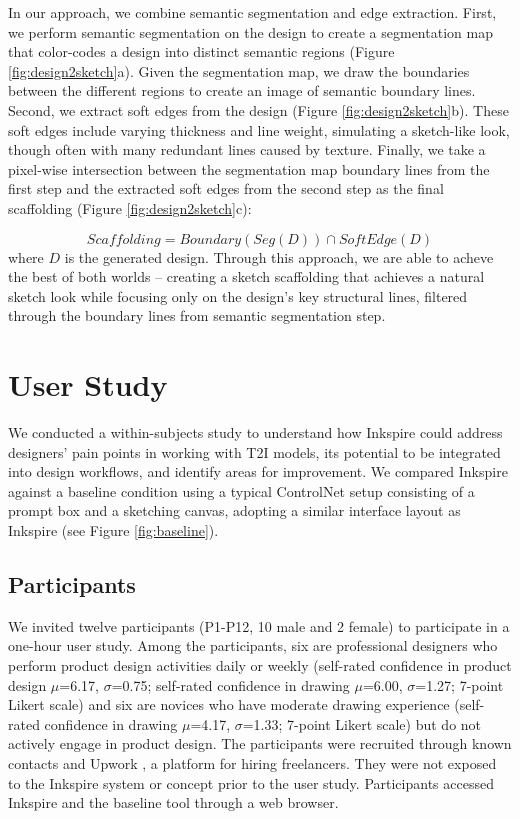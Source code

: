 \documentclass[sigconf, screen]{acmart}
\begin{document}
In our approach, we combine semantic segmentation and edge extraction.
First, we perform semantic segmentation on the design \cite{kirillov2023segment} to create a segmentation map that color-codes a design into distinct semantic regions (Figure \ref{fig:design2sketch}a). Given the segmentation map, we draw the boundaries between the different regions to create an image of semantic boundary lines. Second, we extract soft edges from the design \cite{xie2015holistically} (Figure \ref{fig:design2sketch}b).
These soft edges include varying thickness and line weight, simulating a sketch-like look, though often with many redundant lines caused by texture.
Finally, we take a pixel-wise intersection between the segmentation map boundary lines from the first step and the extracted soft edges from the second step as the final scaffolding (Figure \ref{fig:design2sketch}c):

\begin{equation}
\textit{Scaffolding} = \textit{Boundary}(\textit{Seg}(D)) \cap \textit{SoftEdge}(D)
\end{equation}
where $D$ is the generated design.
Through this approach, we are able to acheve the best of both worlds -- creating a sketch scaffolding that achieves a natural sketch look while focusing only on the design's key structural lines, filtered through the boundary lines from semantic segmentation step.

\section{User Study}

We conducted a within-subjects study to understand how Inkspire could address designers' pain points in working with T2I models, its potential to be integrated into design workflows, and identify areas for improvement. We compared Inkspire against a baseline condition using a typical ControlNet \cite{zhang2023adding} setup consisting of a prompt box and a sketching canvas, adopting a similar interface layout as Inkspire (see Figure \ref{fig:baseline}). 

\subsection{Participants}
We invited twelve participants (P1-P12, 10 male and 2 female) to participate in a one-hour user study. Among the participants, six are professional designers who perform product design activities daily or weekly (self-rated confidence in product design $\mu$=6.17, $\sigma$=0.75; self-rated confidence in drawing $\mu$=6.00, $\sigma$=1.27; 7-point Likert scale) and six are novices who have moderate drawing experience (self-rated confidence in drawing $\mu$=4.17, $\sigma$=1.33; 7-point Likert scale) but do not actively engage in product design. The participants were recruited through known contacts and Upwork \cite{upwork}, a platform for hiring freelancers. They were not exposed to the Inkspire system or concept prior to the user study. Participants accessed Inkspire and the baseline tool through a web browser.
\end{document}
